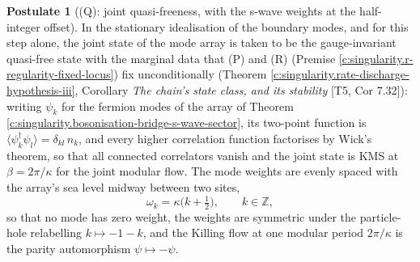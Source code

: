 \documentclass[11pt]{article}
\theoremstyle{definition}
\newtheorem{postulate}[theorem]{Postulate}
\theoremstyle{plain}
\providecommand{\Z}{}\renewcommand{\Z}{\mathbb{Z}}
\begin{document}
\begin{postulate}[(Q): joint quasi-freeness, with the s-wave weights at the half-integer offset]\label{c:singularity.q-joint-quasi-freeness-s-wave}
In the stationary idealisation of the boundary modes, and for this step alone, the joint state of the mode array is taken to be the gauge-invariant quasi-free state with the marginal data that (P) and (R) (Premise \ref{c:singularity.r-regularity-fixed-locus}) fix unconditionally (Theorem \ref{c:singularity.rate-discharge-hypothesis-iii}, Corollary \emph{The chain's state class, and its stability} [T5, Cor 7.32]): writing $\psi_k$ for the fermion modes of the array of Theorem \ref{c:singularity.bosonisation-bridge-s-wave-sector}, its two-point function is $\langle \psi^\dagger_k \psi_l \rangle = \delta_{kl}\,n_k$, and every higher correlation function factorises by Wick's theorem, so that all connected correlators vanish and the joint state is KMS at $\beta = 2\pi/\kappa$ for the joint modular flow. The mode weights are evenly spaced with the array's sea level midway between two sites,
\[
\omega_k = \kappa\bigl(k + \tfrac12\bigr), \qquad k \in \Z ,
\]
so that no mode has zero weight, the weights are symmetric under the particle-hole relabelling $k \mapsto -1-k$, and the Killing flow at one modular period $2\pi/\kappa$ is the parity automorphism $\psi \mapsto -\psi$.


\end{postulate}
\end{document}
